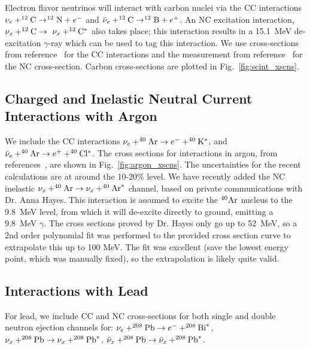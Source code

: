 \documentclass{article}
\begin{document}
Electron flavor neutrinos will interact with carbon nuclei via the CC interactions $\nu_e+^{12}{\rm C}\rightarrow^{12}{\rm N}+e^-$ and $\bar{\nu}_e +^{12}{\rm C}\rightarrow ^{12}{\rm B}+e^+$. An NC excitation interaction, $\nu_x+^{12}{\rm C}\rightarrow~\nu_x+^{12}{\rm  C}^{*}$ also takes place; this interaction results in a 15.1~MeV de-excitation $\gamma$-ray which can be used to tag this interaction. We use cross-sections from reference~\cite{Kolbe:1999au} for the CC interactions and the measurement from reference~\cite{Armbruster:1998gk} for the NC cross-section. Carbon cross-sections are plotted in Fig.~\ref{fig:scint_xscns}.

\subsection{Charged and Inelastic Neutral Current Interactions with Argon}

We include the CC interactions $\nu_e + ^{40}{\rm Ar} \rightarrow e^- + ^{40}{\rm K^*}$, and $\bar{\nu}_e + ^{40}{\rm Ar} \rightarrow e^+ + ^{40}{\rm Cl^*}$. The cross sections for interactions in argon, from references~\cite{GilBotella:2004bv,Kolbe:2003ys}, are shown in Fig.~\ref{fig:argon_xscns}.   The uncertainties for the recent calculations are at around the 10-20\% level. We have recently added the NC inelastic $\nu_x + ^{40}{\rm Ar} \rightarrow \nu_x+ ^{40}{\rm Ar}^*$ channel, based on private communications with Dr. Anna Hayes.  This interaction is assumed to excite the $^{40}{\rm Ar}$ nucleus to the 9.8~MeV level, from which it will de-excite directly to ground, emitting a 9.8~MeV $\gamma$. The cross sections proved by Dr. Hayes only go up to 52~MeV, so a 2nd order polynomial fit was performed to the provided cross section curve to extrapolate this up to 100 MeV.  The fit was excellent (save the lowest energy point, which was manually fixed), so the extrapolation is likely quite valid.

\subsection{Interactions with Lead}

For lead, we include CC and NC cross-sections for both single and double
neutron ejection channels for:
$\nu_e + ^{208}{\rm Pb} \rightarrow e^- + ^{208}{\rm Bi}^{*}$,
$\nu_x + ^{208}{\rm Pb} \rightarrow \nu_x + ^{208}{\rm Pb}^{*}$,
$\bar{\nu}_x + ^{208}{\rm Pb} \rightarrow \bar{\nu}_x + ^{208}{\rm Pb}^{*}$.
\end{document}

